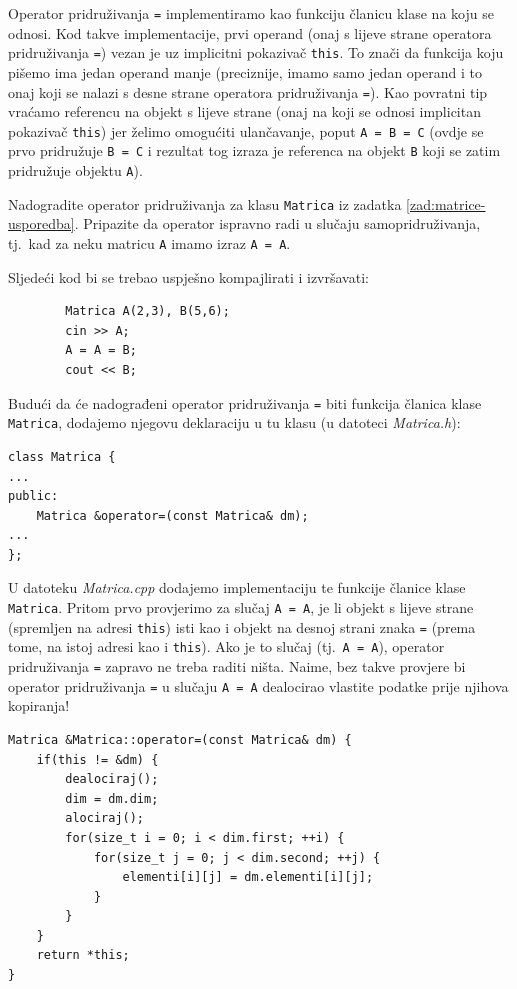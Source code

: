 Operator pridruživanja \texttt{=} implementiramo kao funkciju članicu
klase na koju se odnosi.
Kod takve implementacije, prvi operand (onaj s lijeve strane
operatora pridruživanja \texttt{=}) vezan je uz implicitni pokazivač \texttt{this}.
To znači da funkcija koju pišemo ima jedan operand manje (preciznije,
imamo samo jedan operand i to onaj koji se nalazi s desne strane operatora pridruživanja \texttt{=}).
Kao povratni tip vraćamo referencu na objekt s lijeve strane (onaj na koji se odnosi implicitan pokazivač \texttt{this})
jer želimo omogućiti ulančavanje,
poput \texttt{A = B = C}
(ovdje se prvo pridružuje \texttt{B = C} i rezultat tog izraza je referenca na objekt \texttt{B}
koji se zatim pridružuje objektu \texttt{A}).


\begin{zadatak}\label{zad:matrice-pridruzivanje}
Nadogradite operator pridruživanja za klasu \texttt{Matrica} iz zadatka \ref{zad:matrice-usporedba}.
Pripazite da operator ispravno radi u slučaju samopridruživanja,
tj.\ kad za neku matricu \texttt{A} imamo izraz \texttt{A = A}.
\medskip

Sljedeći kod bi se trebao uspješno kompajlirati i izvršavati:
    \begin{verbatim}
        Matrica A(2,3), B(5,6);
        cin >> A;
        A = A = B;
        cout << B;
    \end{verbatim}
\end{zadatak}


\begin{rjesenje}
    Budući da će nadograđeni operator pridruživanja \texttt{=} biti funkcija članica klase \texttt{Matrica},
    dodajemo njegovu deklaraciju u tu klasu
    (u datoteci \textit{Matrica.h}):
    \begin{verbatim}
class Matrica {
...
public:
    Matrica &operator=(const Matrica& dm);
...
};
    \end{verbatim}

    U datoteku \textit{Matrica.cpp} dodajemo implementaciju te funkcije članice klase \texttt{Matrica}.
    Pritom prvo provjerimo za slučaj \texttt{A = A},
    je li objekt s lijeve strane (spremljen na adresi \texttt{this})
    isti kao i objekt
    na desnoj strani znaka \texttt{=}
    (prema tome, na istoj adresi kao i \texttt{this}).
    Ako je to slučaj (tj.\ \texttt{A = A}),
    operator pridruživanja \texttt{=} zapravo ne treba raditi ništa.
    Naime, bez takve provjere bi operator pridruživanja \texttt{=} u slučaju \texttt{A = A}
    dealocirao vlastite podatke prije njihova kopiranja!

    \begin{verbatim}    
Matrica &Matrica::operator=(const Matrica& dm) {
    if(this != &dm) {
        dealociraj();
        dim = dm.dim;
        alociraj();
        for(size_t i = 0; i < dim.first; ++i) {
            for(size_t j = 0; j < dim.second; ++j) {
                elementi[i][j] = dm.elementi[i][j];
            }
        }
    }
    return *this;
}
    \end{verbatim}
\end{rjesenje}


